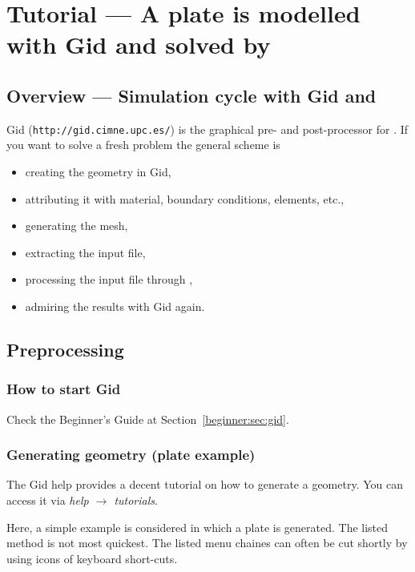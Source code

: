 \chapter{Tutorial --- A plate is modelled with Gid and solved by
  \baci{}}
\label{tut_struct:chap}

\section{Overview --- Simulation cycle with Gid and \baci{}}

Gid (\texttt{http://gid.cimne.upc.es/}) is the graphical pre- and
post-processor for \baci{}\@. If you want to solve a fresh problem
the general scheme is 

\begin{itemize}
\item creating the geometry in Gid, 
\item attributing it with material, boundary conditions, elements, etc., 
\item generating the mesh, 
\item extracting the \baci{} input file, 
\item processing the input file through \baci{}, 
\item admiring the results with Gid again. 
\end{itemize}


\section{Preprocessing}\label{tut_struct:sec:preprocessing}


\subsection{How to start Gid}

Check the Beginner's Guide at Section~\ref{beginner:sec:gid}.


\subsection{Generating geometry (plate example)}

The Gid help provides a decent tutorial on how to generate a geometry.
You can access it via \emph{help $\rightarrow$ tutorials}.

Here, a simple example is considered in which a plate is generated.
The listed method is not most quickest. The listed menu chaines can
often be cut shortly by using icons of keyboard short-cuts. 

